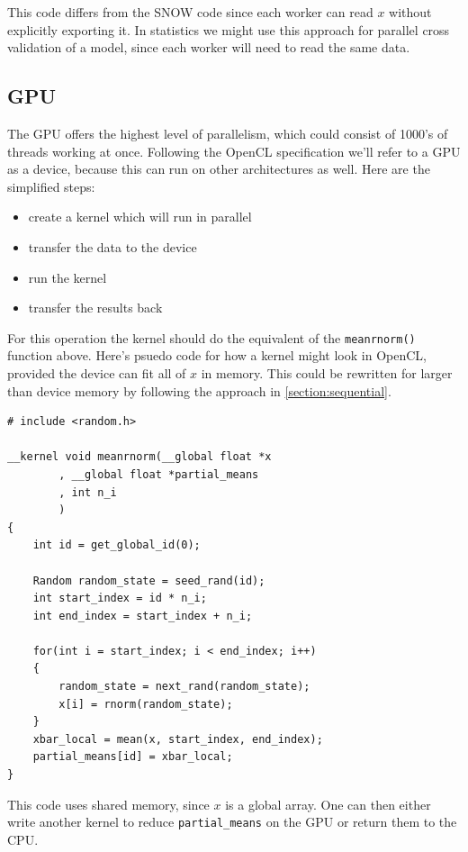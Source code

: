 \documentclass[12pt]{article}
\begin{document}
This code differs from the SNOW code since each worker can read $x$ without
explicitly exporting it. In statistics we might use this approach for
parallel cross validation of a model, since each worker will need to read
the same data.

\subsection{GPU}

The GPU offers the highest level of parallelism, which could consist of
1000's of threads working at once. Following the OpenCL specification we'll
refer to a GPU as a device, because this can run on other architectures as
well. Here are the simplified steps:

\begin{itemize}
    \item create a kernel which will run in parallel
    \item transfer the data to the device
    \item run the kernel
    \item transfer the results back
\end{itemize}

For this operation the kernel should do the equivalent of the
\texttt{meanrnorm()} function above.  Here's psuedo code for how a kernel
might look in OpenCL, provided the device can fit all of $x$ in memory.
This could be rewritten for larger than device memory by following the
approach in \ref{section:sequential}.

\begin{verbatim}
# include <random.h>

__kernel void meanrnorm(__global float *x
        , __global float *partial_means
        , int n_i
        )
{
    int id = get_global_id(0);

    Random random_state = seed_rand(id);
    int start_index = id * n_i;
    int end_index = start_index + n_i;

    for(int i = start_index; i < end_index; i++)
    {
        random_state = next_rand(random_state);
        x[i] = rnorm(random_state);
    }
    xbar_local = mean(x, start_index, end_index);
    partial_means[id] = xbar_local;
}
\end{verbatim}

This code uses shared memory, since $x$ is a global array.
One can then either write another kernel to reduce
\texttt{partial\_means} on the GPU or return them to the CPU.
\end{document}

